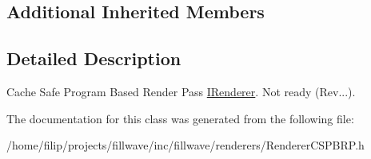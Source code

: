 \subsection*{Additional Inherited Members}


\subsection{Detailed Description}
Cache Safe Program Based Render Pass \hyperlink{classflw_1_1flf_1_1IRenderer}{I\+Renderer}. Not ready (Rev...). 

The documentation for this class was generated from the following file\+:\begin{DoxyCompactItemize}
\item 
/home/filip/projects/fillwave/inc/fillwave/renderers/Renderer\+C\+S\+P\+B\+R\+P.\+h\end{DoxyCompactItemize}
